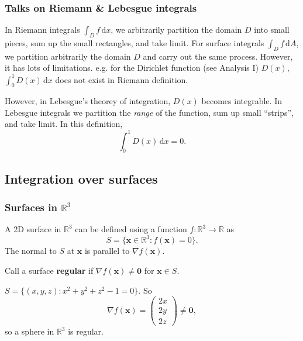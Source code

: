 \subsubsection*{Talks on Riemann \& Lebesgue integrals}
In Riemann integrals $ \int_{D} f \,\mathrm{d}x $, we arbitrarily partition the domain $D$ into small pieces, sum up the small rectangles, and take limit. For surface integrals $ \int_{D} f \,\mathrm{d}A $, we partition arbitrarily the domain $D$ and carry out the same process. However, it has lots of limitations. e.g. for the Dirichlet function (see Analysis I) $D(x)$, $ \int_{0}^{1} D(x) \,\mathrm{d}x $ does not exist in Riemann definition.

However, in Lebesgue's theorey of integration, $D(x)$ becomes integrable. In Lebesgue integrals we partition the \textit{range} of the function, sum up small ``strips'', and take limit. In this definition,
\[
    \int_{0}^{1} D(x) \,\mathrm{d}x=0.
\]

\subsection{Integration over surfaces}
\subsubsection*{Surfaces in $ \mathbb{R}^{3} $}
A 2D surface in $ \mathbb{R}^{3} $ can be defined using a function $ f: \mathbb{R}^{3}\to \mathbb{R}  $ as 
\[
    S = \{\mathbf{x}\in \mathbb{R}^{3}:f(\mathbf{x})=0\}.
\]
The normal to $S$ at $\mathbf{x}$ is parallel to $ \nabla f(\mathbf{x}) $. 
\begin{definition}
    Call a surface \textbf{regular} if $ \nabla f(\mathbf{x})\neq \mathbf{0} $ for $ \mathbf{x}\in S $.
\end{definition}

\begin{example}
    $ S = \{(x,y,z):x^2+y^2+z^2-1=0\} $. So 
    \[
        \nabla f(\mathbf{x}) = \begin{pmatrix}
            2x \\ 2y \\ 2z
        \end{pmatrix}\neq \mathbf{0},
    \]
    so a sphere in $\mathbb{R}^3$ is regular.
\end{example}

